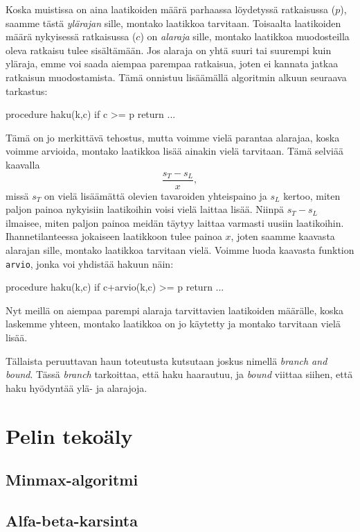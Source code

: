 Koska muistissa on aina laatikoiden määrä parhaassa
löydetyssä ratkaisussa ($p$),
saamme tästä \emph{ylärajan} sille, montako laatikkoa tarvitaan.
Toisaalta laatikoiden määrä nykyisessä ratkaisussa ($c$) on
\emph{alaraja} sille, montako laatikkoa muodosteilla oleva
ratkaisu tulee sisältämään.
Jos alaraja on yhtä suuri tai suurempi kuin yläraja,
emme voi saada aiempaa parempaa ratkaisua,
joten ei kannata jatkaa ratkaisun muodostamista.
Tämä onnistuu lisäämällä algoritmin alkuun seuraava tarkastus:

\begin{code}
procedure haku(k,c)
    if c >= p
        return
    ...
\end{code}

Tämä on jo merkittävä tehostus, mutta voimme vielä parantaa
alarajaa, koska voimme arvioida, montako laatikkoa
lisää ainakin vielä tarvitaan. Tämä selviää kaavalla
\[
\frac{s_T-s_L}{x},
\]
missä $s_T$ on vielä lisäämättä olevien tavaroiden yhteispaino ja
$s_L$ kertoo, miten paljon painoa nykyisiin laatikoihin
voisi vielä laittaa lisää.
Niinpä $s_T-s_L$ ilmaisee, miten paljon painoa meidän täytyy
laittaa varmasti uusiin laatikoihin.
Ihannetilanteessa jokaiseen laatikkoon tulee painoa $x$,
joten saamme kaavasta alarajan sille, montako laatikkoa tarvitaan vielä.
Voimme luoda kaavasta funktion \texttt{arvio},
jonka voi yhdistää hakuun näin:

\begin{code}
procedure haku(k,c)
    if c+arvio(k,c) >= p
        return
    ...
\end{code}

Nyt meillä on aiempaa parempi alaraja tarvittavien laatikoiden määrälle,
koska laskemme yhteen, montako laatikkoa on jo käytetty ja montako
tarvitaan vielä lisää.

Tällaista peruuttavan haun toteutusta kutsutaan joskus nimellä
\emph{branch and bound}.
Tässä \emph{branch} tarkoittaa, että haku haarautuu,
ja \emph{bound} viittaa siihen, että haku hyödyntää
ylä- ja alarajoja.

\section{Pelin tekoäly}

\subsection{Minmax-algoritmi}

\subsection{Alfa-beta-karsinta}
